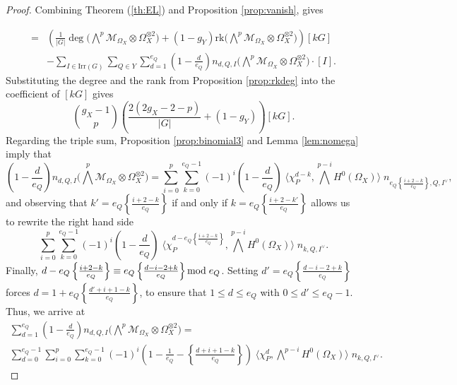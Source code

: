 \documentclass[10pt]{amsart}
\theoremstyle{definition}
\begin{document}
\begin{proof}
Combining Theorem (\ref{th:EL}) and Proposition \ref{prop:vanish}, gives

\begin{align*}
[H^0\big(\bigwedge^p\mathcal{M}_{\Omega_X}\otimes\Omega_X^{\otimes 2}\big)]
=&
  \left( 
\frac{1}{|G|} \deg\big(\bigwedge^p\mathcal{M}_{\Omega_X}\otimes\Omega_X^{\otimes 2}\big)+(1-g_Y) \mathrm{rk}\big(\bigwedge^p\mathcal{M}_{\Omega_X}\otimes\Omega_X^{\otimes 2}\big)
  \right)[kG]\\
  &- 
  \sum_{I \in \mathrm{Irr}(G)} 
  \sum_{Q\in Y}
  \sum_{d=1}^{e_Q}
\left(
1 -\frac{d}{e_Q}
\right)
n_{d,Q,I}\big(\bigwedge^p\mathcal{M}_{\Omega_X}\otimes\Omega_X^{\otimes 2}\big) \cdot [I].
\end{align*}
Substituting the degree and the rank from Proposition \ref{prop:rkdeg} into the coefficient of $[kG]$ gives
\begin{equation}\label{eq:rkdeg}
\binom{g_X-1}{p} \left( 
\frac{2(2g_X-2-p)}{|G|} +(1-g_Y)
  \right)[kG].
\end{equation}
Regarding the triple sum, Proposition \ref{prop:binomial3} and Lemma \ref{lem:nomega} imply that
\[
\left(1-\frac{d}{e_Q}\right)n_{d,Q,I}\big(\bigwedge^p\mathcal{M}_{\Omega_X}\otimes \Omega_X^{\otimes 2}\big)
=
\sum_{i=0}^{p}\sum_{k=0}^{e_Q-1}
(-1)^i
\left(1-\frac{d}{e_Q}\right)
\;
\langle
\chi_P^{d-k},
\bigwedge^{p-i}H^0(\Omega_X)
\rangle
\;
n_{e_Q\left\{ \frac{i+2-k}{e_Q}\right\},Q,I^\vee},
\]
and observing that $k'=e_Q\left\{ \frac{i+2-k}{e_Q}\right\}$ if and only if $k=e_Q\left\{ \frac{i+2-k'}{e_Q}\right\}$ allows us to rewrite the right hand side
\[
\sum_{i=0}^{p}\sum_{k=0}^{e_Q-1}
(-1)^i
\left(1-\frac{d}{e_Q}\right)
\;
\langle
\chi_P^{d-e_Q\left\{ \frac{i+2-k}{e_Q}\right\}},
\bigwedge^{p-i}H^0(\Omega_X)
\rangle
\;
n_{k,Q,I^\vee}.
\]
Finally, $d-e_Q\left\{ \frac{i+2-k}{e_Q}\right\}\equiv e_Q\left\{ \frac{d-i-2+k}{e_Q}\right\}{\rm mod }\;e_Q$. Setting  $d'
=
e_Q
\left\{
\frac{d-i-2+k}{e_Q}
\right\}
$ forces
$
d=
1+
e_Q
\left\{
\frac{d'+i+1-k}{e_Q}
\right\}$,
to ensure that $1\leq d \leq e_Q$ with $0\leq d'\leq e_Q-1$.
Thus, we arrive at
\begin{multline*}
\sum_{d=1}^{e_Q}\left(1-\frac{d}{e_Q}\right)n_{d,Q,I}\big(\bigwedge^p\mathcal{M}_{\Omega_X}\otimes \Omega_X^{\otimes 2}\big)
=
\\
\sum_{d=0}^{e_Q-1}\sum_{i=0}^{p}\sum_{k=0}^{e_Q-1}
(-1)^i
\left(
1-\frac{1}{e_Q}-
\left\{
\frac{d+i+1-k}{e_Q}
\right\}
\right)
\;
\langle
\chi_P^{d},
\bigwedge^{p-i}H^0(\Omega_X)
\rangle
\;
n_{k,Q,I^\vee}.
\end{multline*}

\end{proof}
\end{document}
